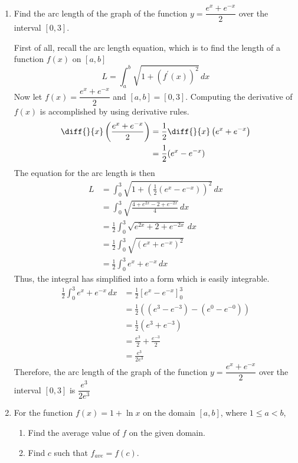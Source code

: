\documentclass{article}
\begin{document}
\begin{enumerate}[label=\textbf{(7.\arabic*)}]
\item Find the arc length of the graph of the function $y=\dfrac{e^x+e^{-x}}{2}$ over the interval $[0,3]$.

First of all, recall the arc length equation, which is to find the length of a function $f(x)$ on $[a,b]$
\[L=\int_a^b\!\sqrt{1+\left(f^\prime(x)\right)^2}\,dx\]
Now let $f(x)=\dfrac{e^x+e^{-x}}{2}$ and $[a,b]=[0,3]$. Computing the derivative of $f(x)$ is accomplished by using derivative rules.
\begin{align*}
\diff{}{x}\left(\frac{e^x+e^{-x}}{2}\right) &= \frac{1}{2}\diff{}{x}\left(e^x+e^{-x}\right)\\
&= \frac{1}{2}(e^x-e^{-x})
\end{align*}
The equation for the arc length is then
\begin{align*}
L &= \int_0^3\!\sqrt{1+\left(\frac{1}{2}(e^x-e^{-x})\right)^2}\,dx \\
&= \int_0^3\!\sqrt{\frac{4+e^{2x}-2+e^{-2x}}{4}}\,dx\\
&= \frac{1}{2}\int_0^3\!\sqrt{e^{2x}+2+e^{-2x}}\,dx\\
&= \frac{1}{2}\int_0^3\!\sqrt{\left(e^x+e^{-x}\right)^2}\\
&= \frac{1}{2}\int_0^3\!e^x+e^{-x}\,dx
\end{align*}
Thus, the integral has simplified into a form which is easily integrable. 
\begin{align*}
\frac{1}{2}\int_0^3\!e^x+e^{-x}\,dx &= \frac{1}{2}\left[e^x-e^{-x}\right]_0^3\\
&= \frac{1}{2}\left(\left(e^3-e^{-3}\right)-\left(e^0-e^{-0}\right)\right)\\
&= \frac{1}{2}\left(e^3+e^{-3}\right)\\
&= \frac{e^3}{2}+\frac{e^{-3}}{2}\\
&= \frac{e^3}{2e^3}
\end{align*}
Therefore,  the arc length of the graph of the function $y=\dfrac{e^x+e^{-x}}{2}$ over the interval $[0,3]$ is $\dfrac{e^3}{2e^3}$


\newpage


\item For the function $f(x)=1+\ln x$ on the domain $[a,b]$, where $1\le a<b$,
\begin{enumerate}
\item Find the average value of $f$ on the given domain.
\item Find $c$ such that $f_{ave}=f(c)$.
\end{enumerate}


\end{enumerate}
\end{document}
